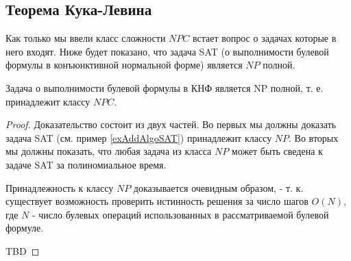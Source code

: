 \subsection{Теорема Кука-Левина}

Как только мы ввели класс сложности $NPC$ встает вопрос о задачах
которые в него входят. Ниже будет показано, что задача SAT (о
выполнимости булевой формулы в конъюнктивной нормальной форме)
является $NP$ полной.  

\begin{theorem}
Задача о выполнимости булевой формулы в КНФ является NP полной,
т. е. принадлежит классу $NPC$.
\label{theoremAddAlgoCookTheorem}
\end{theorem}

\begin{proof}
  Доказательство состоит из двух частей. Во первых мы должны доказать
  задача SAT (см. пример \ref{exAddAlgoSAT}) принадлежит классу
  $NP$. Во вторых мы должны показать, что любая задача из класса $NP$
  может быть сведена к задаче SAT за полиномиальное время.
  
  Принадлежность к классу $NP$ доказывается очевидным образом, -
  т. к. существует возможность проверить истинность решения за число
  шагов $O\left(N\right)$, где $N$ - число булевых операций
  использованных в рассматриваемой булевой формуле.

 
  TBD
\end{proof}

